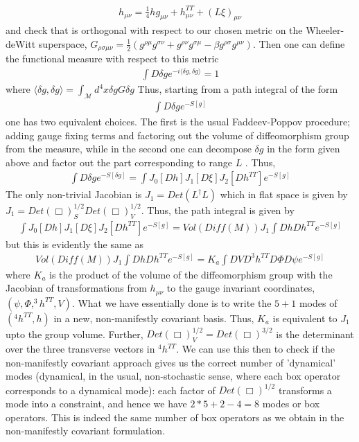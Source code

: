 \documentclass[aps,preprintnumbers,superscriptaddress,longbibliography]{revtex4-1}
\begin{document}
\begin{align}
    h_{\mu\nu}=\frac{1}{4}hg_{\mu\nu}+h_{\mu\nu}^{TT}+(L\xi)_{\mu\nu} 
\end{align}
and check that is orthogonal with respect to our chosen metric on the Wheeler-deWitt superspace, $G_{\rho\sigma\mu\nu}=\frac{1}{2}(g^{\rho\mu}g^{\sigma\nu}+g^{\rho\nu}g^{\sigma\mu}-\beta g^{\rho\sigma}g^{\mu\nu})$. Then one can define the functional measure with respect to this metric 
\begin{align}
    \int D\delta g e^{- i\langle \delta g,\delta g\rangle}=1
\end{align}
where $\langle \delta g,\delta g\rangle=\int_\mathcal{M} d^4x\delta gG\delta g$
Thus, starting from a path integral of the form
\begin{align}
     \int D\delta g e^{-S[g]}
\end{align}
one has two equivalent choices. The first is the usual Faddeev-Poppov procedure; adding gauge fixing terms and factoring out the volume of diffeomorphism group from the measure, while in the second one can decompose $\delta g$ in the form given above and factor out the part corresponding to range $L$ . Thus,
\begin{align}
   \int D\delta g e^{-S[\delta g]}=\int J_0[Dh]J_1[D\xi]J_2[Dh^{TT}] e^{-S[g]} 
\end{align}
The only non-trivial Jacobian is $J_1=Det(L^\dagger L)$ which in flat space is given by $J_1={Det}(\Box)^{1/2}_S{Det}(\Box)^{1/2}_V$. Thus, the path integral is given by
\begin{align}
    \int J_0[Dh]J_1[D\xi]J_2[Dh^{TT}] e^{-S[g]} =Vol(Diff(M))J_1\int DhDh^{TT} e^{-S[g]}
\end{align}
but this is evidently the same as
\begin{align}
    Vol(Diff(M))J_1\int DhDh^{TT} e^{-S[g]}=K_a\int DVD ^3h^{TT}D \Phi D\psi e^{-S[g]}
\end{align}
where $K_a$ is the product of the volume of the diffeomorphism group with the Jacobian of transformations from $h_{\mu\nu}$ to the gauge invariant coordinates, $(\psi, \Phi, ^3h^{TT},V)$. What we have essentially done is to write the $5+1$ modes of $(^4h^{TT},h)$ in a new, non-manifestly covariant basis. Thus, $K_a$ is equivalent to $ J_1$ upto the group volume. Further, ${Det}(\Box)^{1/2}_V={Det}(\Box)^{3/2}$ is the determinant over the three transverse vectors in $^4h^{TT}$. We can use this then to check if the non-manifestly covariant approach gives us the correct number of 'dynamical' modes (dynamical, in the usual, non-stochastic sense, where each box operator corresponds to a dynamical mode): each factor of ${Det}(\Box)^{1/2}$ transforms a mode into a constraint, and hence we have $2*5+2-4=8$ modes or box operators. This is indeed the same number of box operators as we obtain in the non-manifestly covariant formulation.
\end{document}

